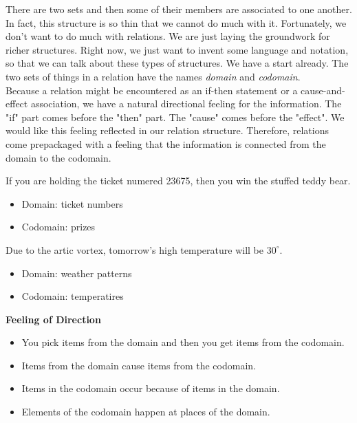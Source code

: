 \documentclass{ximera}
\begin{document}
There are two sets and then some of their members are associated to one another. In fact, this structure is so thin that we cannot do much with it.  Fortunately, we don't want to do much with relations.  We are just laying the groundwork for richer structures.  Right now, we just want to invent some language and notation, so that we can talk about these types of structures. We have a start already. The two sets of things in a relation have the names \textit{domain} and \textit{codomain}. \\


Because a relation might be encountered as an if-then statement or a cause-and-effect association, we have a natural directional feeling for the information.  The "if" part comes before the "then" part.  The "cause" comes before the "effect".  We would like this feeling reflected in our relation structure.  Therefore, relations come prepackaged with a feeling that the information is connected from the domain to the codomain.



\begin{idea}
If you are holding the ticket numered 23675, then you win the stuffed teddy bear. \\

\begin{itemize}
    \item Domain: ticket numbers
    \item Codomain: prizes
\end{itemize}

\end{idea}



\begin{idea}
Due to the artic vortex, tomorrow's high temperature will be $30^{\circ}$. \\

\begin{itemize}
    \item Domain: weather patterns
    \item Codomain: temperatires
\end{itemize}

\end{idea}







\textbf{\textcolor{red!90!darkgray}{Feeling of Direction}}
\begin{itemize}
\item You pick items from the domain and then you get items from the codomain.
\item Items from the domain cause items from the codomain.
\item Items in the codomain occur because of items in the domain.
\item Elements of the codomain happen at places of the domain.
\end{itemize}
\end{document}
